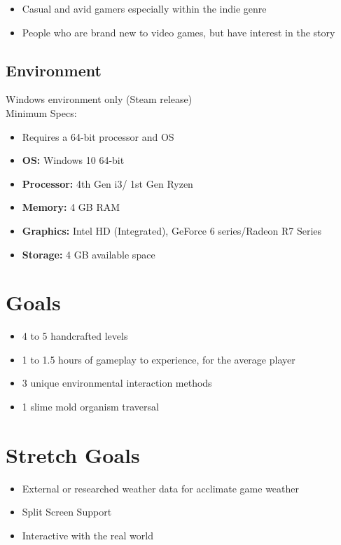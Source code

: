 \documentclass{article}
\begin{document}
\begin{itemize}
\item{Casual and avid gamers especially within the indie genre}
\item{People who are brand new to video games, but have interest in the story}
\end{itemize}

\subsection{Environment}

Windows environment only (Steam release)\\

Minimum Specs:
\begin{itemize}
\item{Requires a 64-bit processor and OS}
\item{\textbf{OS:} Windows 10 64-bit}
\item{\textbf{Processor:} 4th Gen i3/ 1st Gen Ryzen}
\item{\textbf{Memory:} 4 GB RAM}
\item{\textbf{Graphics:} Intel HD (Integrated), GeForce 6 series/Radeon R7 Series}
\item{\textbf{Storage:} 4 GB available space}
\end{itemize}


\section{Goals}

\begin{itemize}
\item{4 to 5 handcrafted levels}
\item{1 to 1.5 hours of gameplay to experience, for the average player}
\item{3 unique environmental interaction methods}
\item{1 slime mold organism traversal}
\end{itemize}

\section{Stretch Goals}

\begin{itemize}
\item{External or researched weather data for acclimate game weather}
\item{Split Screen Support}
\item{Interactive with the real world}
\end{itemize}
\end{document}
